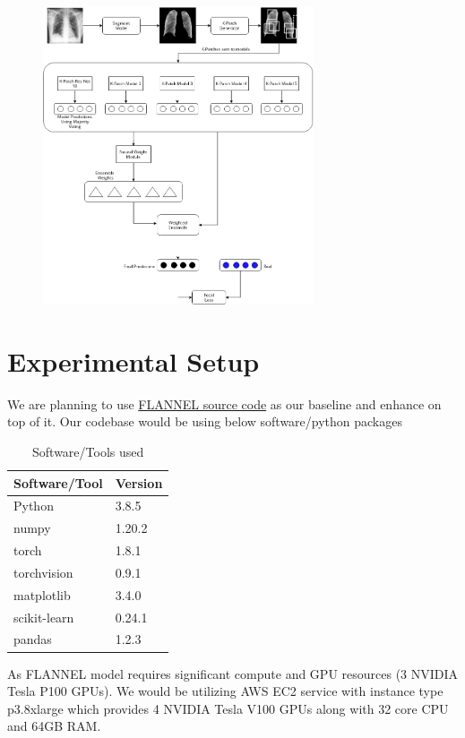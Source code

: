 \documentclass{sigkddExp}
\begin{document}
\begin{figure}[h]
    \includegraphics[width=8cm]{../doc/images/FLANNEL-IMPROVED.png}
\end{figure}


\section{Experimental Setup}

We are planning to use \href{https://github.com/qxiaobu/FLANNEL} {FLANNEL source
    code}  as our baseline and enhance on top of it. Our codebase would be
using below software/python packages
\begin{table}[H]
    \centering
    \caption{Software/Tools used}
    \begin{tabular}{|l|l|} \hline
        Software/Tool & Version \\ \hline
        Python        & 3.8.5   \\ \hline
        numpy         & 1.20.2  \\ \hline
        torch         & 1.8.1   \\ \hline
        torchvision   & 0.9.1   \\ \hline
        matplotlib    & 3.4.0   \\ \hline
        scikit-learn  & 0.24.1  \\ \hline
        pandas        & 1.2.3   \\
        \hline\end{tabular}
\end{table}

As FLANNEL model requires significant compute and GPU
resources (3 NVIDIA Tesla P100 GPUs). We would be utilizing AWS EC2 service with
instance type p3.8xlarge which provides 4 NVIDIA Tesla V100 GPUs along with 32
core CPU and 64GB RAM.
\end{document}
